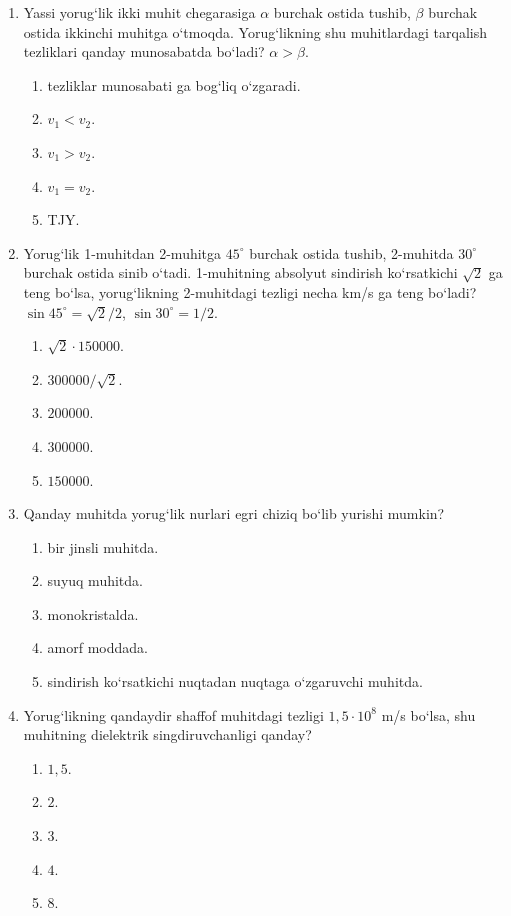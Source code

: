 \begin{enumerate}
\item Yassi yorug‘lik ikki muhit chegarasiga $\alpha$ burchak ostida tushib, $\beta$ burchak ostida ikkinchi muhitga o‘tmoqda. Yorug‘likning shu muhitlardagi tarqalish tezliklari qanday munosabatda bo‘ladi? $\alpha>\beta$.
\begin{enumerate}[label=\Alph*)]
\item tezliklar munosabati ga bog‘liq o‘zgaradi.
\item $v_1<v_2$.
\item $v_1>v_2$.
\item $v_1=v_2$.
\item TJY.
\end{enumerate}

\item Yorug‘lik 1-muhitdan 2-muhitga $45^\circ$ burchak ostida tushib, 2-muhitda $30^\circ$ burchak ostida sinib o‘tadi. 1-muhitning absolyut sindirish ko‘rsatkichi $\sqrt{2}$ ga teng bo‘lsa, yorug‘likning 2-muhitdagi tezligi necha km/s ga teng bo‘ladi? $\sin45^\circ=\sqrt{2}/2$, $\sin30^\circ=1/2$.
\begin{enumerate}[label=\Alph*)]
\item $\sqrt{2}\cdot150000$.
\item $300000/\sqrt{2}$.
\item $200000$.
\item $300000$.
\item $150000$.
\end{enumerate}

\item Qanday muhitda yorug‘lik nurlari egri chiziq bo‘lib yurishi mumkin?
\begin{enumerate}[label=\Alph*)]
\item bir jinsli muhitda.
\item suyuq muhitda.
\item monokristalda.
\item amorf moddada.
\item sindirish ko‘rsatkichi nuqtadan nuqtaga o‘zgaruvchi muhitda.
\end{enumerate}

\item Yorug‘likning qandaydir shaffof muhitdagi tezligi $1,5\cdot10^8$ m/s bo‘lsa, shu muhitning dielektrik singdiruvchanligi qanday?
\begin{enumerate}[label=\Alph*)]
\item $1,5$.
\item $2$.
\item $3$.
\item $4$.
\item $8$.
\end{enumerate}

\end{enumerate}

